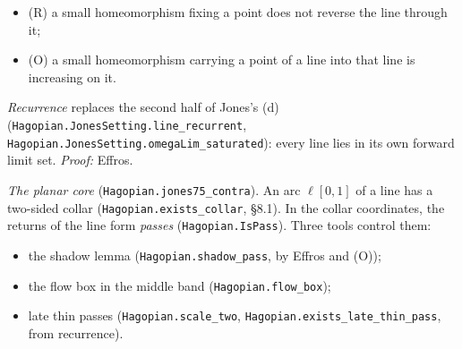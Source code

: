 \documentclass[11pt]{article}
\newcommand{\lean}[1]{\texttt{#1}}
\begin{document}
\begin{itemize}
  \item (R) a small homeomorphism fixing a point does not reverse the line through it;
  \item (O) a small homeomorphism carrying a point of a line into that line is increasing on it.
\end{itemize}

\emph{Recurrence} replaces the second half of Jones's (d) (\lean{Hagopian.\hspace{0pt}JonesSetting.\hspace{0pt}line\_\hspace{0pt}recurrent}, \lean{Hagopian.\hspace{0pt}JonesSetting.\hspace{0pt}omegaLim\_\hspace{0pt}saturated}): every line lies in its own forward limit set. \emph{Proof:} Effros.

\emph{The planar core} (\lean{Hagopian.\hspace{0pt}jones75\_\hspace{0pt}contra}). An arc $\ell [0, 1]$ of a line has a two-sided collar (\lean{Hagopian.\hspace{0pt}exists\_\hspace{0pt}collar}, \S{}8.1). In the collar coordinates, the returns of the line form \emph{passes} (\lean{Hagopian.\hspace{0pt}IsPass}). Three tools control them:

\begin{itemize}
  \item the shadow lemma (\lean{Hagopian.\hspace{0pt}shadow\_\hspace{0pt}pass}, by Effros and (O));
  \item the flow box in the middle band (\lean{Hagopian.\hspace{0pt}flow\_\hspace{0pt}box});
  \item late thin passes (\lean{Hagopian.\hspace{0pt}scale\_\hspace{0pt}two}, \lean{Hagopian.\hspace{0pt}exists\_\hspace{0pt}late\_\hspace{0pt}thin\_\hspace{0pt}pass}, from recurrence).
\end{itemize}
\end{document}
